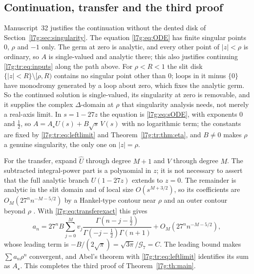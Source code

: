 \documentclass[11pt,letterpaper]{article}
\theoremstyle{remark}\newtheorem{remark}[theorem]{Remark}
\newcommand{\G}{\mathcal G_7}\newcommand{\Ast}{A_\star}
\newcounter{l7gtrsavedeq}
\begin{document}
\subsection{Continuation, transfer and the third proof}\label{l7g:tr:sec:transfer}
Manuscript~32 justifies the continuation without the dented disk of
Section~\ref{l7g:sec:singularity}. The equation \eqref{l7g:eq:ODE} has finite
singular points $0$, $\rho$ and $-1$ only. The germ at zero is analytic,
and every other point of $|z|<\rho$ is ordinary, so $A$ is single-valued
and analytic there; this also justifies continuing \eqref{l7g:tr:eq:inputs}
along the path above. For $\rho<R<1$ the slit disk
$\{|z|<R\}\setminus[\rho,R)$ contains no singular point other than $0$;
loops in it minus $\{0\}$ have monodromy generated by a loop about zero,
which fixes the analytic germ. So the continued solution is single-valued,
its singularity at zero is removable, and it supplies the complex
$\Delta$-domain at $\rho$ that singularity analysis needs, not merely a
real-axis limit. In $s=1-27z$ the equation is \eqref{l7g:eq:sODE}, with
exponents $0$ and $\frac12$, so $A=\Ast\widehat U(s)+B\sqrt s\,V(s)$ with no
logarithmic term; the constants are fixed by \eqref{l7g:tr:eq:leftlimit} and
Theorem~\ref{l7g:tr:thm:eta}, and $B\ne0$ makes $\rho$ a genuine
singularity, the only one on $|z|=\rho$.

For the transfer, expand $\widehat U$ through degree $M+1$ and $V$ through
degree $M$. The subtracted integral-power part is a polynomial in $z$; it is
not necessary to assert that the full analytic branch $U(1-27z)$ extends to
$z=0$. The remainder is analytic in the slit domain and of local size
$O(s^{M+3/2})$, so its coefficients are $O_M(27^nn^{-M-5/2})$ by a
Hankel-type contour near $\rho$ and an outer contour beyond $\rho$
\cite[Chapter~VI]{l7g:flajolet}. With \eqref{l7g:eq:transferexact} this gives
\begin{equation}\label{l7g:tr:eq:gammaexp}
 a_n=27^nB\sum_{j=0}^{M}v_j
 \frac{\Gamma(n-j-\frac12)}{\Gamma(-j-\frac12)\Gamma(n+1)}
 +O_M(27^nn^{-M-5/2}),
\end{equation}
whose leading term is $-B/(2\sqrt\pi)=\sqrt{3\pi}/\G=C$. The leading bound
makes $\sum a_n\rho^n$ convergent, and Abel's theorem with
\eqref{l7g:tr:eq:leftlimit} identifies its sum as $\Ast$. This completes the
third proof of Theorem~\ref{l7g:th:main}.
\end{document}
